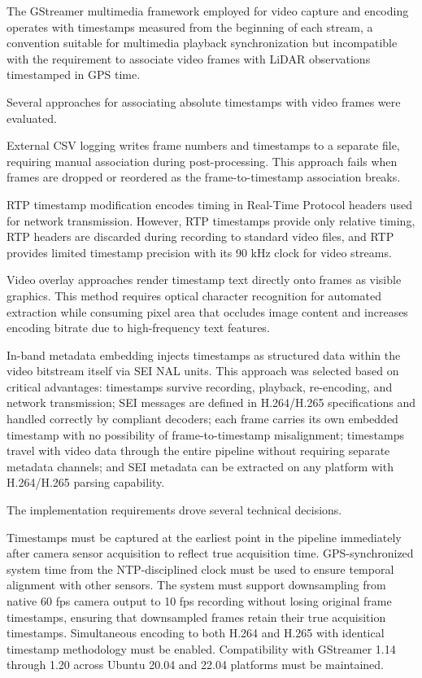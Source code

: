 \documentclass{erauthesis}
\begin{document}

The GStreamer multimedia framework employed for video capture and encoding operates with timestamps measured from the beginning of each stream, a convention suitable for multimedia playback synchronization but incompatible with the requirement to associate video frames with LiDAR observations timestamped in GPS time.

Several approaches for associating absolute timestamps with video frames were evaluated.

External CSV logging writes frame numbers and timestamps to a separate file, requiring manual association during post-processing.
This approach fails when frames are dropped or reordered as the frame-to-timestamp association breaks.

RTP timestamp modification encodes timing in Real-Time Protocol headers used for network transmission.
However, RTP timestamps provide only relative timing, RTP headers are discarded during recording to standard video files, and RTP provides limited timestamp precision with its 90 kHz clock for video streams.

Video overlay approaches render timestamp text directly onto frames as visible graphics.
This method requires optical character recognition for automated extraction while consuming pixel area that occludes image content and increases encoding bitrate due to high-frequency text features.

In-band metadata embedding injects timestamps as structured data within the video bitstream itself via SEI NAL units.
This approach was selected based on critical advantages: timestamps survive recording, playback, re-encoding, and network transmission; SEI messages are defined in H.264/H.265 specifications and handled correctly by compliant decoders; each frame carries its own embedded timestamp with no possibility of frame-to-timestamp misalignment; timestamps travel with video data through the entire pipeline without requiring separate metadata channels; and SEI metadata can be extracted on any platform with H.264/H.265 parsing capability.


The implementation requirements drove several technical decisions.

Timestamps must be captured at the earliest point in the pipeline immediately after camera sensor acquisition to reflect true acquisition time.
GPS-synchronized system time from the NTP-disciplined clock must be used to ensure temporal alignment with other sensors.
The system must support downsampling from native 60 fps camera output to 10 fps recording without losing original frame timestamps, ensuring that downsampled frames retain their true acquisition timestamps.
Simultaneous encoding to both H.264 and H.265 with identical timestamp methodology must be enabled.
Compatibility with GStreamer 1.14 through 1.20 across Ubuntu 20.04 and 22.04 platforms must be maintained.
\end{document}

